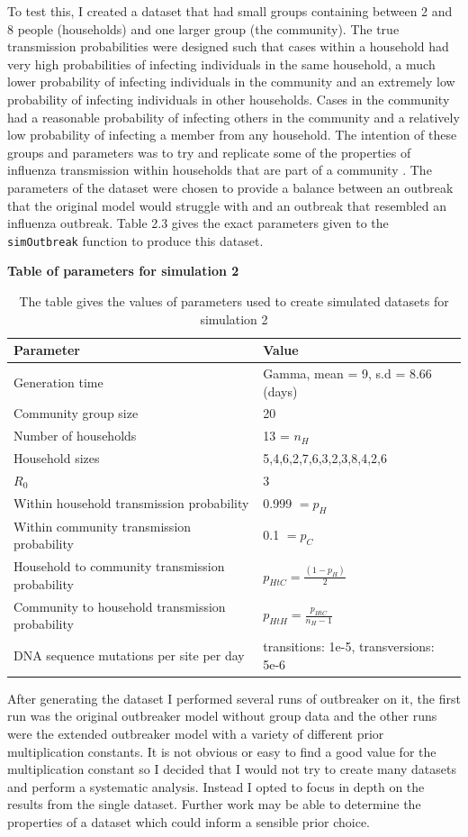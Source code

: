 \documentclass[11pt,a4paper]{report}
\begin{document}
To test this, I created a dataset that had small groups containing between 2 and 8 people (households) and one larger group (the community). The true transmission probabilities were designed such that cases within a household had very high probabilities of infecting individuals in the same household, a much lower probability of infecting individuals in the community and an extremely low probability of infecting individuals in other households. Cases in the community had a reasonable probability of infecting others in the community and a relatively low probability of infecting a member from any household. The intention of these groups and parameters was to try and replicate some of the properties of influenza transmission within households that are part of a community \citep{Cauchemez04}. The parameters of the dataset were chosen to provide a balance between an outbreak that the original model would struggle with and an outbreak that resembled an influenza outbreak. Table 2.3 gives the exact parameters given to the {\tt simOutbreak} function to produce this dataset.
\begin{table}[h!]
\centering
{\bf Table of parameters for simulation 2}
\caption{The table gives the values of parameters used to create simulated datasets for simulation 2}
\begin{tabular}{|l|l|}
\hline
Parameter & Value \\
\hline
Generation time & Gamma, mean = 9, s.d = 8.66 (days) \\
\hline
Community group size & 20 \\
\hline
Number of households & 13 = $n_{H}$ \\
\hline
Household sizes & 5,4,6,2,7,6,3,2,3,8,4,2,6 \\
\hline
$R_0$ & 3 \\
\hline
Within household transmission probability & 0.999 $= p_{H}$ \\
\hline
Within community transmission probability & 0.1 $= p_{C}$\\
\hline
Household to community transmission probability & $p_{HtC} =\frac{(1-p_{H})}{2}$ \\
\hline
Community to household transmission probability & $p_{HtH} = \frac{p_{HtC}}{n_{H} - 1}$\\
\hline
DNA sequence mutations per site per day & transitions: 1e-5, transversions: 5e-6 \\
\hline
\end{tabular}
\end{table}
After generating the dataset I performed several runs of outbreaker on it, the first run was the original outbreaker model without group data and the other runs were the extended outbreaker model with a variety of different prior multiplication constants. It is not obvious or easy to find a good value for the multiplication constant so I decided that I would not try to create many datasets and perform a systematic analysis. Instead I opted to focus in depth on the results from the single dataset. Further work may be able to determine the properties of a dataset which could inform a sensible prior choice.
\end{document}
